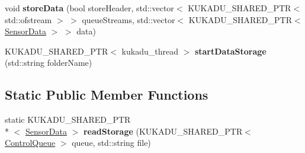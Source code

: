 \begin{DoxyCompactItemize}
\item 
\hypertarget{classkukadu_1_1SensorStorage_ae327ec5a25cb995598c0a04fd2675074}{void {\bfseries store\-Data} (bool store\-Header, std\-::vector$<$ K\-U\-K\-A\-D\-U\-\_\-\-S\-H\-A\-R\-E\-D\-\_\-\-P\-T\-R$<$ std\-::ofstream $>$ $>$ queue\-Streams, std\-::vector$<$ K\-U\-K\-A\-D\-U\-\_\-\-S\-H\-A\-R\-E\-D\-\_\-\-P\-T\-R$<$ \hyperlink{classkukadu_1_1SensorData}{Sensor\-Data} $>$ $>$ data)}\label{classkukadu_1_1SensorStorage_ae327ec5a25cb995598c0a04fd2675074}

\item 
\hypertarget{classkukadu_1_1SensorStorage_ab68803e1c9d13b0431cf7635137e3c6b}{K\-U\-K\-A\-D\-U\-\_\-\-S\-H\-A\-R\-E\-D\-\_\-\-P\-T\-R$<$ kukadu\-\_\-thread $>$ {\bfseries start\-Data\-Storage} (std\-::string folder\-Name)}\label{classkukadu_1_1SensorStorage_ab68803e1c9d13b0431cf7635137e3c6b}

\end{DoxyCompactItemize}
\subsection*{Static Public Member Functions}
\begin{DoxyCompactItemize}
\item 
\hypertarget{classkukadu_1_1SensorStorage_a670a757897a4f1f0008b4f877dc8480e}{static K\-U\-K\-A\-D\-U\-\_\-\-S\-H\-A\-R\-E\-D\-\_\-\-P\-T\-R\\*
$<$ \hyperlink{classkukadu_1_1SensorData}{Sensor\-Data} $>$ {\bfseries read\-Storage} (K\-U\-K\-A\-D\-U\-\_\-\-S\-H\-A\-R\-E\-D\-\_\-\-P\-T\-R$<$ \hyperlink{classkukadu_1_1ControlQueue}{Control\-Queue} $>$ queue, std\-::string file)}\label{classkukadu_1_1SensorStorage_a670a757897a4f1f0008b4f877dc8480e}

\end{DoxyCompactItemize}
